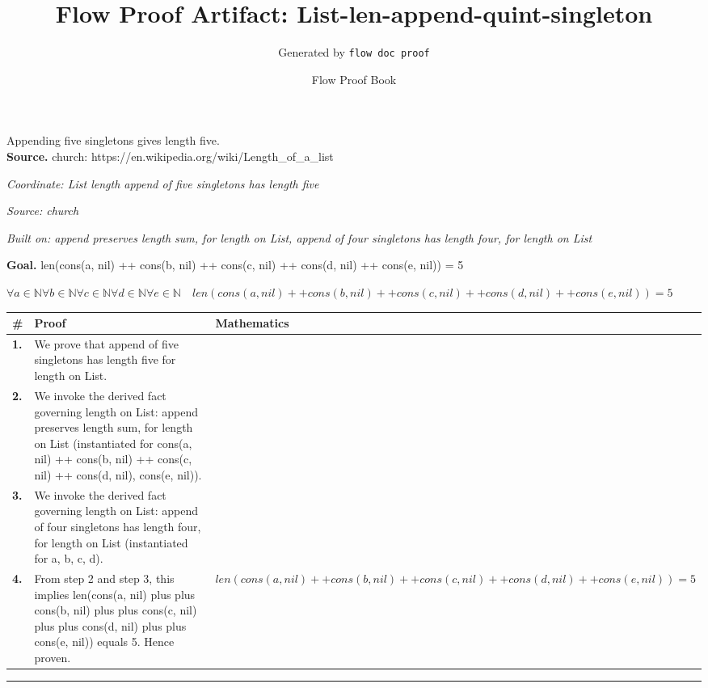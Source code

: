 \documentclass[11pt]{article}
\title{Flow Proof Artifact: List-len-append-quint-singleton}
\author{Generated by \texttt{flow doc proof}}
\date{Flow Proof Book}
\theoremstyle{definition}
\begin{document}
\maketitle
Appending five singletons gives length five.\\[0.5em]
\textbf{Source.} church: https://en.wikipedia.org/wiki/Length\_of\_a\_list\\[0.5em]
\bigskip
{}\par
\smallskip\noindent\textit{Coordinate: List \cdot length \cdot append of five singletons has length five}\par
\smallskip\noindent\textit{Source: church}\par
\smallskip\noindent\textit{Built on: append preserves length sum, for length on List, append of four singletons has length four, for length on List}\par
\medskip
\noindent\textbf{Goal.} len(cons(a, nil) ++ cons(b, nil) ++ cons(c, nil) ++ cons(d, nil) ++ cons(e, nil)) = 5\par
\noindent$\displaystyle \forall a \in \mathbb{N} \forall b \in \mathbb{N} \forall c \in \mathbb{N} \forall d \in \mathbb{N} \forall e \in \mathbb{N}\quad len(cons(a, nil) ++ cons(b, nil) ++ cons(c, nil) ++ cons(d, nil) ++ cons(e, nil)) = 5$\par
\medskip
\noindent
\begin{tabular}{@{} >{\raggedright\arraybackslash}p{} >{\raggedright\arraybackslash}p{} >{\raggedleft\arraybackslash}p{} @{}}
\textbf{\#} & \textbf{Proof} & \textbf{Mathematics} \\
\midrule
\textbf{1.} & We prove that append of five singletons has length five for length on List. & \\[0.45em]
\textbf{2.} & We invoke the derived fact governing length on List: append preserves length sum, for length on List (instantiated for cons(a, nil) ++ cons(b, nil) ++ cons(c, nil) ++ cons(d, nil), cons(e, nil)). & \\[0.45em]
\textbf{3.} & We invoke the derived fact governing length on List: append of four singletons has length four, for length on List (instantiated for a, b, c, d). & \\[0.45em]
\textbf{4.} & From step 2 and step 3, this implies len(cons(a, nil) plus plus cons(b, nil) plus plus cons(c, nil) plus plus cons(d, nil) plus plus cons(e, nil)) equals 5. Hence proven. & $\displaystyle len(cons(a, nil) ++ cons(b, nil) ++ cons(c, nil) ++ cons(d, nil) ++ cons(e, nil)) = 5$ \\[0.45em]
\bottomrule
\end{tabular}
\label{thm:List-length-append_of_five_singletons_has_length_five}
\par\medskip\hrule
\end{document}
